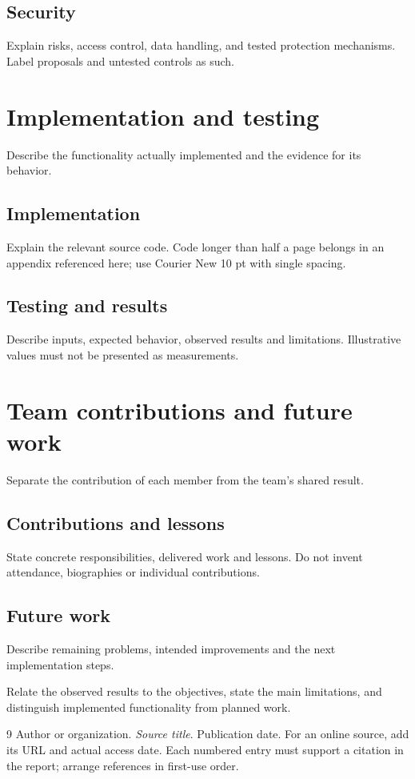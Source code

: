 \documentclass{../shared/classes/utmreport}
\begin{document}
\section{Security}
Explain risks, access control, data handling, and tested protection mechanisms. Label proposals and untested controls as such.

\chapter{Implementation and testing}
Describe the functionality actually implemented and the evidence for its behavior.
\section{Implementation}
Explain the relevant source code. Code longer than half a page belongs in an appendix referenced here; use Courier New 10 pt with single spacing.
\section{Testing and results}
Describe inputs, expected behavior, observed results and limitations. Illustrative values must not be presented as measurements.

\chapter{Team contributions and future work}
Separate the contribution of each member from the team's shared result.
\section{Contributions and lessons}
State concrete responsibilities, delivered work and lessons. Do not invent attendance, biographies or individual contributions.
\section{Future work}
Describe remaining problems, intended improvements and the next implementation steps.

\utmconclusions
Relate the observed results to the objectives, state the main limitations, and distinguish implemented functionality from planned work.

\begin{thebibliography}{9}
 Author or organization. \textit{Source title}. Publication date. For an online source, add its URL and actual access date. Each numbered entry must support a citation in the report; arrange references in first-use order.
\end{thebibliography}
\end{document}
